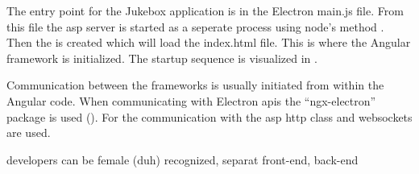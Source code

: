 
The entry point for the Jukebox application is in the Electron main.js file. From this file the \gls{asp} server is started as a seperate process using node's  method \cite{nodeSpawn}. Then the  is created which will load the index.html file. This is where the Angular framework is initialized. The startup sequence is visualized in .


Communication between the frameworks is usually initiated from within the Angular code. When communicating with Electron \glspl{api} the \enquote{ngx-electron} package is used (). For the communication with the \gls{asp} \gls{http} class and websockets are used.



developers can be female (duh)
recognized, separat
front-end, back-end
